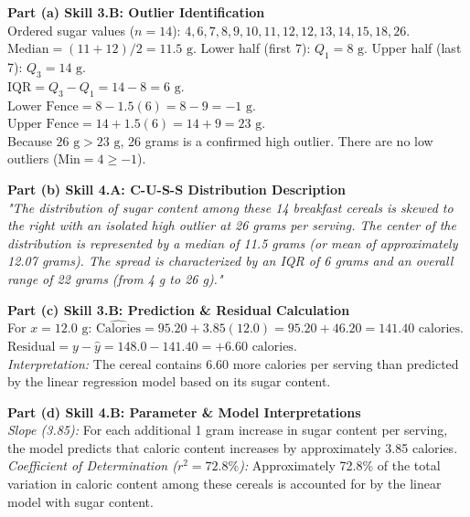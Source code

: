\begin{frqrubricbox}
\textbf{Part (a) Skill 3.B: Outlier Identification}\\
Ordered sugar values ($n = 14$): $4, 6, 7, 8, 9, 10, 11, 12, 12, 13, 14, 15, 18, 26$.\\
$\text{Median} = (11 + 12)/2 = 11.5\text{ g}$. Lower half (first 7): $Q_1 = 8\text{ g}$. Upper half (last 7): $Q_3 = 14\text{ g}$.\\
$\text{IQR} = Q_3 - Q_1 = 14 - 8 = 6\text{ g}$.\\
$\text{Lower Fence} = 8 - 1.5(6) = 8 - 9 = -1\text{ g}$.\\
$\text{Upper Fence} = 14 + 1.5(6) = 14 + 9 = 23\text{ g}$.\\
Because $26\text{ g} > 23\text{ g}$, 26 grams is a confirmed high outlier. There are no low outliers ($\text{Min} = 4 \ge -1$).

\textbf{Part (b) Skill 4.A: C-U-S-S Distribution Description}\\
\textit{"The distribution of sugar content among these 14 breakfast cereals is skewed to the right with an isolated high outlier at 26 grams per serving. The center of the distribution is represented by a median of 11.5 grams (or mean of approximately 12.07 grams). The spread is characterized by an IQR of 6 grams and an overall range of 22 grams (from 4 g to 26 g)."}

\textbf{Part (c) Skill 3.B: Prediction \& Residual Calculation}\\
For $x = 12.0\text{ g}$: $\widehat{\text{Calories}} = 95.20 + 3.85(12.0) = 95.20 + 46.20 = 141.40\text{ calories}$.\\
$\text{Residual} = y - \hat{y} = 148.0 - 141.40 = +6.60\text{ calories}$.\\
\textit{Interpretation:} The cereal contains 6.60 more calories per serving than predicted by the linear regression model based on its sugar content.

\textbf{Part (d) Skill 4.B: Parameter \& Model Interpretations}\\
\textit{Slope (3.85):} For each additional 1 gram increase in sugar content per serving, the model predicts that caloric content increases by approximately 3.85 calories.\\
\textit{Coefficient of Determination ($r^2 = 72.8\%$):} Approximately 72.8\% of the total variation in caloric content among these cereals is accounted for by the linear model with sugar content.


\end{frqrubricbox}
